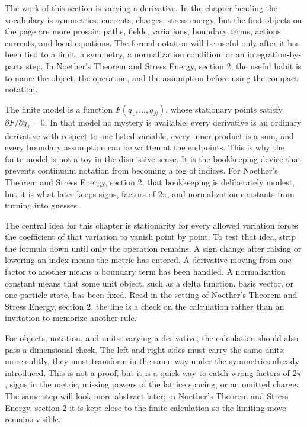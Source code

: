 The work of this section is varying a derivative.  In the chapter heading the vocabulary is symmetries, currents, charges, stress-energy, but the first objects on the page are more prosaic: paths, fields, variations, boundary terms, actions, currents, and local equations.  The formal notation will be useful only after it has been tied to a limit, a symmetry, a normalization condition, or an integration-by-parts step.  In Noether's Theorem and Stress Energy, section 2, the useful habit is to name the object, the operation, and the assumption before using the compact notation.

The finite model is a function \(F(q_1,\ldots,q_N)\), whose stationary points satisfy \( \partial F/\partial q_j=0 \).  In that model no mystery is available: every derivative is an ordinary derivative with respect to one listed variable, every inner product is a sum, and every boundary assumption can be written at the endpoints.  This is why the finite model is not a toy in the dismissive sense.  It is the bookkeeping device that prevents continuum notation from becoming a fog of indices.  For Noether's Theorem and Stress Energy, section 2, that bookkeeping is deliberately modest, but it is what later keeps signs, factors of \(2\pi\), and normalization constants from turning into guesses.

The central idea for this chapter is stationarity for every allowed variation forces the coefficient of that variation to vanish point by point.  To test that idea, strip the formula down until only the operation remains.  A sign change after raising or lowering an index means the metric has entered.  A derivative moving from one factor to another means a boundary term has been handled.  A normalization constant means that some unit object, such as a delta function, basis vector, or one-particle state, has been fixed.  Read in the setting of Noether's Theorem and Stress Energy, section 2, the line is a check on the calculation rather than an invitation to memorize another rule.

For objects, notation, and units: varying a derivative, the calculation should also pass a dimensional check.  The left and right sides must carry the same units; more subtly, they must transform in the same way under the symmetries already introduced.  This is not a proof, but it is a quick way to catch wrong factors of \(2\pi\), signs in the metric, missing powers of the lattice spacing, or an omitted charge.  The same step will look more abstract later; in Noether's Theorem and Stress Energy, section 2 it is kept close to the finite calculation so the limiting move remains visible.

